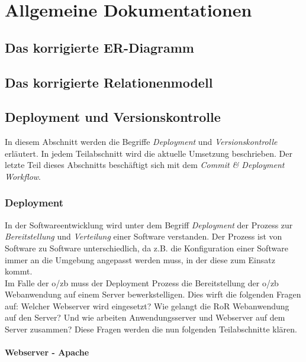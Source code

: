 \documentclass[12pt,             %
               a4paper,          %
               listof=totoc,     %
               index=totoc,      %
               bibliography=totoc,%
               oneside,         %
               BCOR1cm,          %
               english   %
               ]{scrbook}
\begin{document}
\clearpage
\chapter{Allgemeine Dokumentationen}
\section{Das korrigierte ER-Diagramm}

\section{Das korrigierte Relationenmodell}

\section{Deployment und Versionskontrolle}
In diesem Abschnitt werden die Begriffe \textit{Deployment} und \textit{Versionskontrolle} erläutert. In jedem Teilabschnitt wird die aktuelle Umsetzung beschrieben. Der letzte Teil dieses Abschnitts beschäftigt sich mit dem \textit{Commit \& Deployment Workflow}.

\subsection{Deployment}
In der Softwareentwicklung wird unter dem Begriff \textit{Deployment} der Prozess zur \textit{Bereitstellung} und \textit{Verteilung} einer Software verstanden. Der Prozess ist von Software zu Software unterschiedlich, da z.B. die Konfiguration einer Software immer an die Umgebung angepasst werden muss, in der diese zum Einsatz kommt.\\

Im Falle der o/zb muss der Deployment Prozess die Bereitstellung der o/zb Webanwendung auf einem Server bewerkstelligen. Dies wirft die folgenden Fragen auf: Welcher Webserver wird eingesetzt? Wie gelangt die RoR Webanwendung auf den Server? Und wie arbeiten Anwendungsserver und Webserver auf dem Server zusammen? Diese Fragen werden die nun folgenden Teilabschnitte klären.

\subsubsection{Webserver - Apache}
\end{document}
